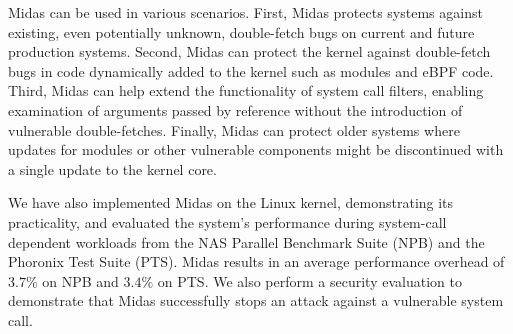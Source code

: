 Midas can be used in various scenarios. 
First, Midas protects systems against existing, even potentially unknown,
double-fetch bugs on current and future production systems.
Second, Midas can protect the kernel against double-fetch bugs in code
dynamically added to the kernel such as modules and eBPF code.
Third, Midas can help extend the functionality of system call filters,
enabling examination of arguments passed by reference without the introduction
of vulnerable double-fetches.
Finally, Midas can protect older systems where updates for modules or other
vulnerable components might be discontinued with a single update to the
kernel core.

We have also implemented Midas on the Linux kernel, demonstrating its
practicality, and evaluated the system's performance during system-call
dependent workloads from the NAS Parallel Benchmark Suite (NPB) and the
Phoronix Test Suite (PTS).
Midas results in an average performance overhead of $3.7\%$ on NPB and
$3.4\%$ on PTS.
We also perform a security evaluation to demonstrate that Midas successfully
stops an attack against a vulnerable system call.


